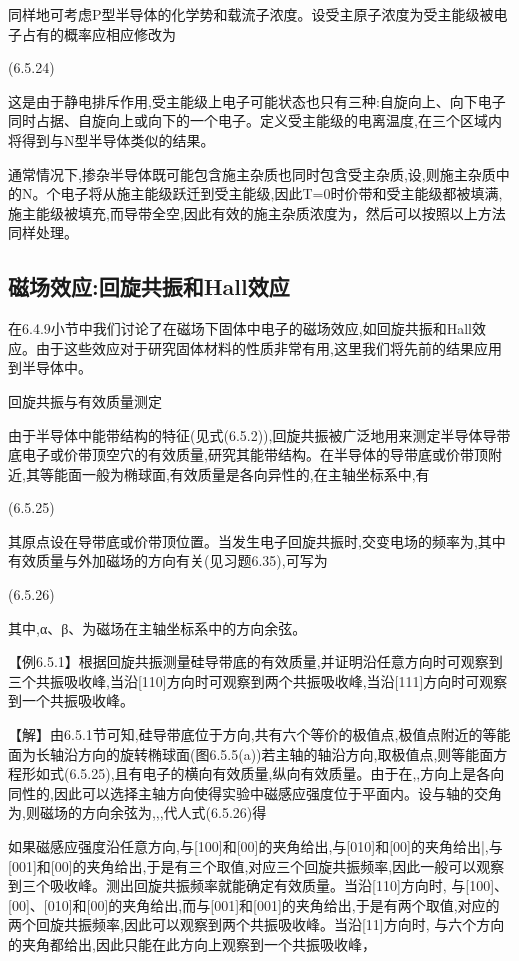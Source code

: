同样地可考虑P型半导体的化学势和载流子浓度。设受主原子浓度为受主能级被电子占有的概率应相应修改为

 	(6.5.24)

这是由于静电排斥作用,受主能级上电子可能状态也只有三种:自旋向上、向下电子同时占据、自旋向上或向下的一个电子。定义受主能级的电离温度,在三个区域内将得到与N型半导体类似的结果。

通常情况下,掺杂半导体既可能包含施主杂质也同时包含受主杂质,设,则施主杂质中的N。个电子将从施主能级跃迁到受主能级,因此T=0时价带和受主能级都被填满, 施主能级被填充,而导带全空,因此有效的施主杂质浓度为，然后可以按照以上方法同样处理。

\subsection{磁场效应:回旋共振和Hall效应}

在6.4.9小节中我们讨论了在磁场下固体中电子的磁场效应,如回旋共振和Hall效应。由于这些效应对于研究固体材料的性质非常有用,这里我们将先前的结果应用到半导体中。

回旋共振与有效质量测定

由于半导体中能带结构的特征(见式(6.5.2)),回旋共振被广泛地用来测定半导体导带底电子或价带顶空穴的有效质量,研究其能带结构。在半导体的导带底或价带顶附近,其等能面一般为椭球面,有效质量是各向异性的,在主轴坐标系中,有

 	(6.5.25)

其原点设在导带底或价带顶位置。当发生电子回旋共振时,交变电场的频率为,其中有效质量与外加磁场的方向有关(见习题6.35),可写为

	 (6.5.26)

其中,α、β、为磁场在主轴坐标系中的方向余弦。

【例6.5.1】根据回旋共振测量硅导带底的有效质量,并证明沿任意方向时可观察到三个共振吸收峰,当沿[110]方向时可观察到两个共振吸收峰,当沿[111]方向时可观察到一个共振吸收峰。

【解】由6.5.1节可知,硅导带底位于方向,共有六个等价的极值点,极值点附近的等能面为长轴沿方向的旋转椭球面(图6.5.5(a))若主轴的轴沿方向,取极值点,则等能面方程形如式(6.5.25),且有电子的横向有效质量,纵向有效质量。由于在,,方向上是各向同性的,因此可以选择主轴方向使得实验中磁感应强度位于平面内。设与轴的交角为,则磁场的方向余弦为,,,代人式(6.5.26)得



如果磁感应强度沿任意方向,与[100]和[00]的夹角给出,与[010]和[00]的夹角给出|,与[001]和[00]的夹角给出,于是有三个取值,对应三个回旋共振频率,因此一般可以观察到三个吸收峰。测出回旋共振频率就能确定有效质量。当沿[110]方向时, 与[100]、[00]、[010]和[00]的夹角给出,而与[001]和[001]的夹角给出,于是有两个取值,对应的两个回旋共振频率,因此可以观察到两个共振吸收峰。当沿[11]方向时, 与六个方向的夹角都给出,因此只能在此方向上观察到一个共振吸收峰，



